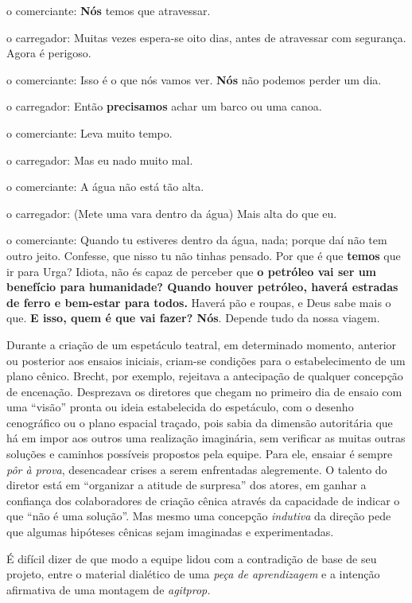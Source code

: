 {\sc o comerciante}: {\bf Nós} temos que atravessar.

{\sc o carregador}: Muitas vezes espera-se oito dias, antes de atravessar com
segurança. Agora é perigoso.

{\sc o comerciante}: Isso é o que nós vamos ver. {\bf Nós} não podemos perder
um dia.

{\sc o carregador}: Então {\bf precisamos} achar um barco ou uma canoa.

{\sc o comerciante}: Leva muito tempo.

{\sc o carregador}: Mas eu nado muito mal.

{\sc o comerciante}: A água não está tão alta.

{\sc o carregador}: (Mete uma vara dentro da água) Mais alta do que eu.

{\sc o comerciante}: Quando tu estiveres dentro da água, nada; porque daí não
tem outro jeito. Confesse, que nisso tu não tinhas pensado. Por que é
que {\bf temos} que ir para Urga? Idiota, não és capaz de perceber que
{\bf o petróleo vai ser um benefício para humanidade? Quando houver
petróleo, haverá estradas de ferro e bem-estar para todos.} Haverá pão e
roupas, e Deus sabe mais o que. {\bf E isso, quem é que vai fazer? Nós}.
Depende tudo da nossa viagem.
\stopblockquote


\subject{Concepção em processo: a sala como tribuna}

Durante a criação de um espetáculo teatral, em determinado momento,
anterior ou posterior aos ensaios iniciais, criam-se condições para o
estabelecimento de um plano cênico. Brecht, por exemplo, rejeitava a
antecipação de qualquer concepção de encenação. Desprezava os
diretores
que chegam no primeiro dia de ensaio com uma “visão” pronta ou ideia
estabelecida do espetáculo, com o desenho cenográfico ou o plano
espacial traçado, pois sabia da dimensão autoritária que há em impor aos
outros uma realização imaginária, sem verificar as muitas outras
soluções e caminhos possíveis propostos pela equipe. Para ele, ensaiar é
sempre {\it pôr à prova}, desencadear crises a serem enfrentadas
alegremente. O talento do diretor está em “organizar a atitude de
surpresa” dos atores, em ganhar a confiança dos colaboradores de criação
cênica através da capacidade de indicar o que “não é uma solução”. Mas
mesmo uma concepção {\it indutiva} da direção pede que algumas hipóteses
cênicas sejam imaginadas e experimentadas.

É difícil dizer de que modo a equipe lidou com a contradição de base de
seu projeto, entre o material dialético de uma {\it peça de
aprendizagem} e a intenção afirmativa de uma montagem de {\it agitprop.}

